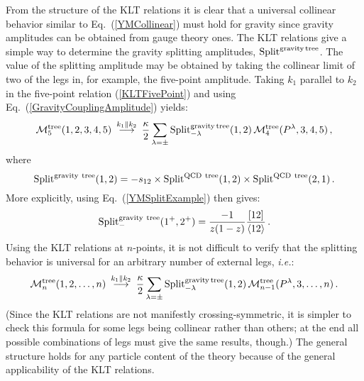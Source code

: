 {}From the structure of the KLT relations it is clear that a universal
collinear behavior similar to Eq.~(\ref{YMCollinear}) must hold for 
gravity 
since gravity amplitudes can be obtained from gauge theory ones.  The
KLT relations give a simple way to determine the gravity splitting
amplitudes, ${\mathop{\rm Split}\nolimits}^{\rm gravity\, tree}$.  The
value of the splitting amplitude may be obtained by taking the
collinear limit of two of the legs in, for example, the five-point
amplitude.  Taking $k_1$ parallel to $k_2$ in the five-point relation
(\ref{KLTFivePoint}) and using Eq.~(\ref{GravityCouplingAmplitude}) 
yields:
%
%
\begin{equation}
{\cal M}_5^{\rm tree}(1,2,3,4,5)\ 
\mathop{\longrightarrow}^{k_1 \parallel k_2}\ 
{\kappa \over 2}  \sum_{\lambda = \pm} 
{\mathop{\rm Split}\nolimits}_{-\lambda}^{\rm gravity\, tree}(1,2) \, 
   {\cal  M}_{4}^{\rm tree}(P^\lambda,3,4,5)\,,
\label{GravCollinearFive}
\end{equation}
%
%
where 
%
\begin{equation}
{\mathop{\rm Split}\nolimits}^{\rm gravity\ tree}(1,2) = 
-s_{12} \times {\mathop{\rm Split}\nolimits}^{\rm QCD\ tree}(1,2) \times 
{\mathop{\rm Split}\nolimits}^{\rm QCD\ tree}(2,1) \,.
\label{GravTreeColl}
\end{equation}
%
More explicitly, using Eq.~(\ref{YMSplitExample}) then gives: 
%
\begin{equation}
{\mathop{\rm Split}\nolimits}_{-}^{\rm gravity\ tree}(1^+,2^+) =
{ - 1\over z (1-z)} {[{1}{2}] \over \langle {1}{2}\rangle }\,.
\label{GravTreeCollExample}
\end{equation}
%
Using the KLT relations at $n$-points, it is not difficult to 
verify that the splitting behavior is universal for an 
arbitrary number of external legs, {\it i.e.}:
%
\begin{equation}
{\cal M}_n^{\rm tree}(1,2,\ldots,n)\ 
\mathop{\longrightarrow}^{k_1 \parallel k_2}\ 
{\kappa \over 2}  \sum_{\lambda = \pm} 
{\mathop{\rm Split}\nolimits}_{-\lambda}^{\rm gravity\, tree}(1,2) \, 
   {\cal  M}_{n-1}^{\rm tree}(P^\lambda,3,\ldots,n)\,.
\label{GravCollinear}
\end{equation}
%
(Since the KLT relations are not manifestly crossing-symmetric, it is
simpler to check this formula for some legs being collinear rather
than others; at the end all possible combinations of legs must give
the same results, though.)  The general structure holds for any
particle content of the theory because of the general applicability of
the KLT relations.

